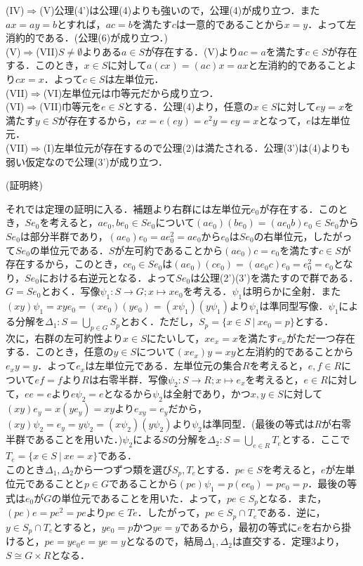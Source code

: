 (IV)$\Rightarrow$(V)公理(4')は公理(4)よりも強いので，公理(4)が成り立つ．また$ax=ay=b$とすれば，$ac=b$を満たす$c$は一意的であることから$x=y$．よって左消約的である．(公理(6)が成り立つ．)\\
(V)$\Rightarrow$(VII)$S\neq\emptyset$よりある$a\in S$が存在する．(V)より$ac=a$を満たす$c\in S$が存在する．このとき，$x\in S$に対して$a(cx)=(ac)x=ax$と左消約的であることより$cx=x$．よって$c\in S$は左単位元．\\
(VII)$\Rightarrow$(VI)左単位元は巾等元だから成り立つ．\\
(VI)$\Rightarrow$(VII)巾等元を$e\in S$とする．公理(4)より，任意の$x\in S$に対して$ey=x$を満たす$y\in S$が存在するから，$ex=e(ey)=e^2y=ey=x$となって，$e$は左単位元．\\
(VII)$\Rightarrow$(I)左単位元が存在するので公理(2)は満たされる．公理(3')は(4)よりも弱い仮定なので公理(3')が成り立つ．
\begin{flushright}
(証明終)
\end{flushright}
それでは定理の証明に入る．補題より右群には左単位元$e_0$が存在する．このとき，$Se_0$を考えると，$ae_0,be_0\in Se_0$について$(ae_0)(be_0)=(ae_0b)e_0\in Se_0$から$Se_0$は部分半群であり，$(ae_0)e_0=ae_0^2=ae_0$から$e_0$は$Se_0$の右単位元，したがって$Se_0$の単位元である．$S$が左可約であることから$(ae_0)c=e_0$を満たす$c\in S$が存在するから，このとき，$ce_0\in Se_0$は$(ae_0)(ce_0)=(ae_0c)e_0=e_0^2=e_0$となり，$Se_0$における右逆元となる．よって$Se_0$は公理(2')(3')を満たすので群である．$G=Se_0$とおく．写像$\psi_1:S\rightarrow G;x\mapsto xe_0$を考える．$\psi_1$は明らかに全射．また$(xy)\psi_1=xye_0=(xe_0)(ye_0)=(x\psi_1)(y\psi_1)$より$\psi_1$は準同型写像．$\psi_1$による分解を$\Delta_1:S=\displaystyle\bigcup_{p\in G}S_p$とおく．ただし，$S_p=\{x\in S\:|\:xe_0=p\}$とする．\\
次に，右群の左可約性より$x\in S$にたいして，$xe_x=x$を満たす$e_x$がただ一つ存在する．このとき，任意の$y\in S$について$(xe_x)y=xy$と左消約的であることから$e_xy=y$．よって$e_x$は左単位元である．左単位元の集合$R$を考えると，$e,f\in R$について$ef=f$より$R$は右零半群．写像$\psi_2:S\rightarrow R;x\mapsto e_x$を考えると，$e\in R$に対して，$ee=e$より$e\psi_2=e$となるから$\psi_2$は全射であり，かつ$x,y\in S$に対して$(xy)e_y=x(ye_y)=xy$より$e_{xy}=e_{y}$だから，$(xy)\psi_2=e_y=y\psi_2=(x\psi_2)(y\psi_2)$より$\psi_2$は準同型．(最後の等式は$R$が右零半群であることを用いた．)$\psi_2$による$S$の分解を$\Delta_2:S=\displaystyle\bigcup_{e\in R}T_e$とする．ここで$T_e=\{x\in S\:|\:xe=x\}$である．\\
このとき$\Delta_1,\Delta_2$から一つずつ類を選び$S_p,T_e$とする．$pe\in S$を考えると，$e$が左単位元であることと$p\in G$であることから$(pe)\psi_1=p(ee_0)=pe_0=p$．最後の等式は$e_0$が$G$の単位元であることを用いた．よって，$pe\in S_p$となる．また，$(pe)e=pe^2=pe$より$pe\in Te$．したがって，$pe\in S_p\cap T_e$である．逆に，$y\in S_p\cap T_e$とすると，$ye_0=p$かつ$ye=y$であるから，最初の等式に$e$を右から掛けると，$pe=ye_0e=ye=y$となるので，結局$\Delta_1,\Delta_2$は直交する．定理3より，$S\cong G\times R$となる．
